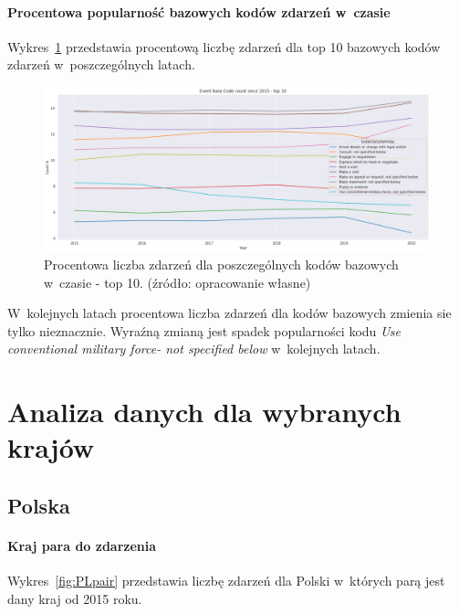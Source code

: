 \documentclass[11pt]{report}
\begin{document}
    \paragraph{Procentowa popularność bazowych kodów zdarzeń w~czasie}
    Wykres~\ref{fig:GLOBALEBCperc} przedstawia procentową liczbę zdarzeń dla top 10 bazowych kodów zdarzeń w~poszczególnych latach.
    \begin{figure}[!htp]
        \centering
        \includegraphics[width=\linewidth]{fig/GLOBAL/EBCperc.png}
        \caption{Procentowa liczba zdarzeń dla poszczególnych kodów bazowych w~czasie - top 10. (źródło: opracowanie własne)}
        \label{fig:GLOBALEBCperc}
    \end{figure}
    W~kolejnych latach procentowa liczba zdarzeń dla kodów bazowych zmienia sie tylko nieznacznie.
    Wyraźną zmianą jest spadek popularności kodu \textit{Use conventional military force- not specified below} w~kolejnych latach.


    \section{Analiza danych dla wybranych krajów}\label{sec:analiza-danych-dla-wybranych-krajów}

    \subsection{Polska}

    \paragraph{Kraj para do zdarzenia}


    Wykres~\ref{fig:PLpair} przedstawia liczbę zdarzeń dla Polski w~których parą jest dany kraj od 2015 roku.
\end{document}
